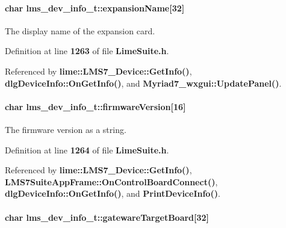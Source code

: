 \paragraph[{expansion\+Name}]{\setlength{\rightskip}{0pt plus 5cm}char lms\+\_\+dev\+\_\+info\+\_\+t\+::expansion\+Name[32]}\label{structlms__dev__info__t_a776d57f238f890612ec35c105a0e407c}


The display name of the expansion card. 



Definition at line {\bf 1263} of file {\bf Lime\+Suite.\+h}.



Referenced by {\bf lime\+::\+L\+M\+S7\+\_\+\+Device\+::\+Get\+Info()}, {\bf dlg\+Device\+Info\+::\+On\+Get\+Info()}, and {\bf Myriad7\+\_\+wxgui\+::\+Update\+Panel()}.

\paragraph[{firmware\+Version}]{\setlength{\rightskip}{0pt plus 5cm}char lms\+\_\+dev\+\_\+info\+\_\+t\+::firmware\+Version[16]}\label{structlms__dev__info__t_ac3653c9c7a75c828771532f117a31c34}


The firmware version as a string. 



Definition at line {\bf 1264} of file {\bf Lime\+Suite.\+h}.



Referenced by {\bf lime\+::\+L\+M\+S7\+\_\+\+Device\+::\+Get\+Info()}, {\bf L\+M\+S7\+Suite\+App\+Frame\+::\+On\+Control\+Board\+Connect()}, {\bf dlg\+Device\+Info\+::\+On\+Get\+Info()}, and {\bf Print\+Device\+Info()}.

\paragraph[{gateware\+Target\+Board}]{\setlength{\rightskip}{0pt plus 5cm}char lms\+\_\+dev\+\_\+info\+\_\+t\+::gateware\+Target\+Board[32]}\label{structlms__dev__info__t_a21425c6c819f663c25932e506512c031}


